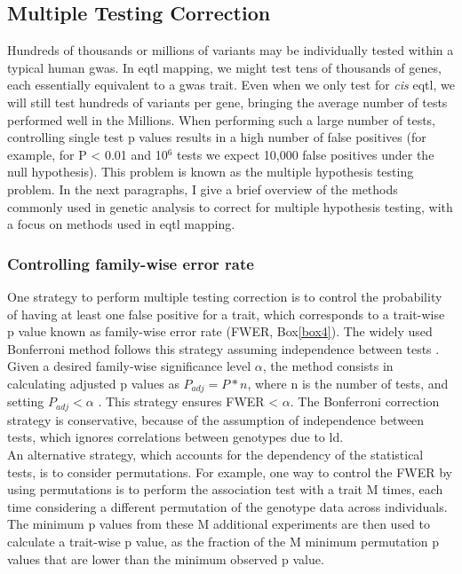 \subsection{Multiple Testing Correction}

Hundreds of thousands or millions of variants may be individually tested within a typical human \gls{gwas}. 
In e\gls{qtl} mapping, we might test tens of thousands of genes, each essentially equivalent to a \gls{gwas} trait. 
Even when we only test for \textit{cis} e\gls{qtl}, we will still test hundreds of variants per gene, bringing the average number of tests performed well in the Millions.  
When performing such a large number of tests, controlling single test p values results in a high number of false positives (for example, for P < 0.01 and 10$^6$ tests we expect 10,000 false positives under the null hypothesis). 
This problem is known as the multiple hypothesis testing problem. 
In the next paragraphs, I give a brief overview of the methods commonly used in genetic analysis to correct for multiple hypothesis testing, with a focus on methods used in e\gls{qtl} mapping.

\subsubsection{Controlling family-wise error rate} 

One strategy to perform multiple testing correction is to control the probability of having at least one false positive for a trait, which corresponds to a trait-wise p value known as family-wise error rate (FWER, Box\ref{box4}).
The widely used Bonferroni method follows this strategy assuming independence between tests \cite{laird2010fundamentals}. 
Given a desired family-wise significance level $\alpha$, the method consists in calculating adjusted p values as $P_{adj} = P*n $, where n is the number of tests, and setting $P_{adj} < \alpha$ . 
This strategy ensures FWER < $\alpha$. 
The Bonferroni correction strategy is conservative, because of the assumption of independence between tests, which ignores correlations between genotypes due to \gls{ld}.\\

An alternative strategy, which accounts for the dependency of the statistical tests, is to consider permutations. 
For example, one way to control the FWER by using permutations is to perform the association test with a trait M times, each time considering a different permutation of the genotype data across individuals.
The minimum p values from these M additional experiments are then used to calculate a trait-wise p value, as the fraction of the M minimum permutation p values that are lower than the minimum observed p value. 

